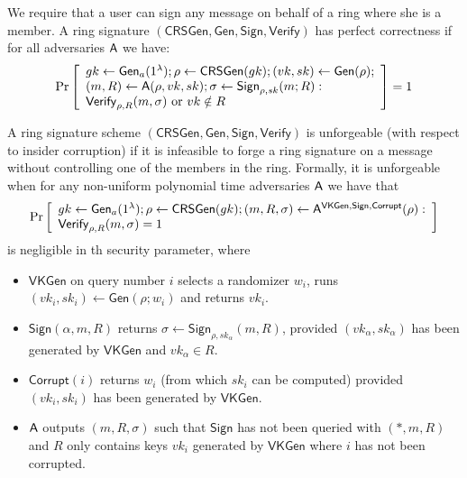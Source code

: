 \begin{definition}
We require that a user can sign any message on behalf of a ring where she is a member. A ring signature $(\mathsf{CRSGen}, \mathsf{Gen}, \mathsf{Sign}, \mathsf{Verify})$
has perfect correctness if for all adversaries $\mathsf{A}$ we have:
$$
\Pr\left[\begin{array}{l}
gk\gets\mathsf{Gen}_a(1^\lambda);\rho\gets\mathsf{CRSGen}(gk);(vk,sk)\gets\mathsf{Gen}(\rho);\\
(m,R)\gets\mathsf{A}(\rho,vk,sk);\sigma\gets\mathsf{Sign}_{\rho,sk}(m;R):\\
\mathsf{Verify}_{\rho,R}(m,\sigma)\text{ or }vk\notin R
\end{array}\right]=1
$$
\end{definition}

\begin{definition}
A ring signature scheme $(\mathsf{CRSGen}, \mathsf{Gen}, \mathsf{Sign}, \mathsf{Verify})$
is unforgeable (with respect to insider corruption) if it is infeasible to forge a ring
signature on a message without controlling one of the members in the ring. Formally, it
is unforgeable when for any non-uniform polynomial
time adversaries $\mathsf{A}$ we have that
$$
\Pr\left[\begin{array}{l}
gk\gets\mathsf{Gen}_a(1^\lambda);\rho\gets\mathsf{CRSGen}(gk);(m,R,\sigma)\gets\mathsf{A}^{\mathsf{VKGen},\mathsf{Sign},\mathsf{Corrupt}}(\rho):\\
\mathsf{Verify}_{\rho,R}(m,\sigma)=1
\end{array}\right]
$$
is negligible in th security parameter, where

\begin{itemize}
\item $\mathsf{VKGen}$ on query number $i$ selects a randomizer $w_i$, runs $(vk_i,sk_i) \gets \mathsf{Gen}(\rho; w_i)$
and returns $vk_i$.
\item $\mathsf{Sign}(\alpha, m, R)$ returns $\sigma \gets \mathsf{Sign}_{\rho,sk_\alpha}(m, R)$, provided $(vk_\alpha, sk_\alpha)$ has been generated
by $\mathsf{VKGen}$ and $vk_\alpha\in R$.
\item $\mathsf{Corrupt}(i)$ returns $w_i$ (from which $sk_i$ can be computed) provided $(vk_i, sk_i)$ has
been generated by $\mathsf{VKGen}$.
\item $\mathsf{A}$ outputs $(m, R, \sigma)$ such that $\mathsf{Sign}$ has not been queried with $(*, m, R)$ and $R$
only contains keys $vk_i$ generated by $\mathsf{VKGen}$ where $i$ has not been corrupted.
\end{itemize}
\end{definition}

